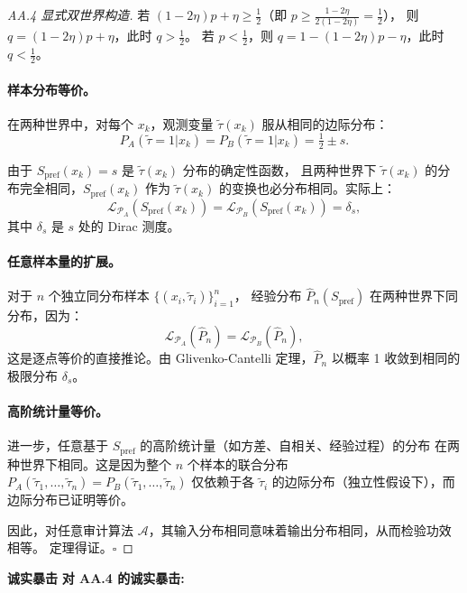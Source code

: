 \documentclass[12pt,a4paper]{article}
\newcommand{\critique}{\medskip\noindent\textbf{诚实暴击}\quad}
\newcommand{\Alg}{\mathcal{A}}
\begin{document}
\begin{proof}[AA.4 显式双世界构造]
若 $(1-2\eta)p + \eta \geq \tfrac12$（即 $p \geq \frac{1-2\eta}{2(1-2\eta)} = \frac12$），
则 $q = (1-2\eta)p + \eta$，此时 $q > \tfrac12$。
若 $p < \tfrac12$，则 $q = 1 - (1-2\eta)p - \eta$，此时 $q < \tfrac12$。

\paragraph{样本分布等价。}
在两种世界中，对每个 $x_k$，观测变量 $\tilde{\tau}(x_k)$ 服从相同的边际分布：
\[
P_A(\tilde{\tau}=1|x_k) = P_B(\tilde{\tau}=1|x_k) = \tfrac12 \pm s.
\]

由于 $S_{\mathrm{pref}}(x_k) = s$ 是 $\tilde{\tau}(x_k)$ 分布的确定性函数，
且两种世界下 $\tilde{\tau}(x_k)$ 的分布完全相同，$S_{\mathrm{pref}}(x_k)$
作为 $\tilde{\tau}(x_k)$ 的变换也必分布相同。实际上：
\[
\mathcal{L}_{\mathcal{P}_A}(S_{\mathrm{pref}}(x_k)) = \mathcal{L}_{\mathcal{P}_B}(S_{\mathrm{pref}}(x_k)) = \delta_s,
\]
其中 $\delta_s$ 是 $s$ 处的 Dirac 测度。

\paragraph{任意样本量的扩展。}
对于 $n$ 个独立同分布样本 $\{(x_i, \tilde{\tau}_i)\}_{i=1}^n$，
经验分布 $\hat{P}_n(S_{\mathrm{pref}})$ 在两种世界下同分布，因为：
\[
\mathcal{L}_{\mathcal{P}_A}(\hat{P}_n) = \mathcal{L}_{\mathcal{P}_B}(\hat{P}_n),
\]
这是逐点等价的直接推论。由 Glivenko-Cantelli 定理，$\hat{P}_n$ 以概率 1
收敛到相同的极限分布 $\delta_s$。

\paragraph{高阶统计量等价。}
进一步，任意基于 $S_{\mathrm{pref}}$ 的高阶统计量（如方差、自相关、经验过程）的分布
在两种世界下相同。这是因为整个 $n$ 个样本的联合分布
$P_A(\tilde{\tau}_1,\dots,\tilde{\tau}_n) = P_B(\tilde{\tau}_1,\dots,\tilde{\tau}_n)$
仅依赖于各 $\tilde{\tau}_i$ 的边际分布（独立性假设下），而边际分布已证明等价。

因此，对任意审计算法 $\Alg$，其输入分布相同意味着输出分布相同，从而检验功效相等。
定理得证。\hfill$\square$
\end{proof}

\critique
\textbf{对 AA.4 的诚实暴击:}
\end{document}
